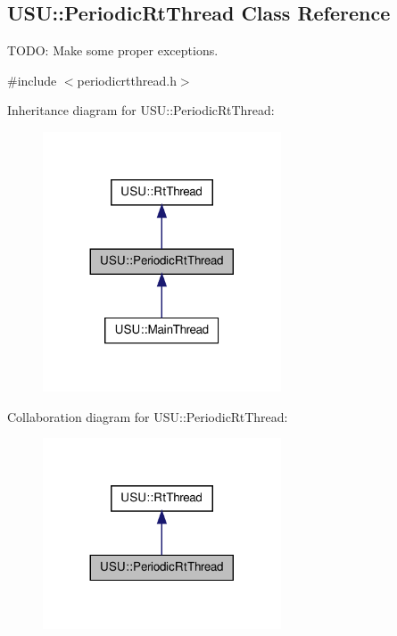 \hypertarget{class_u_s_u_1_1_periodic_rt_thread}{\subsection{\-U\-S\-U\-:\-:\-Periodic\-Rt\-Thread \-Class \-Reference}
\label{class_u_s_u_1_1_periodic_rt_thread}
}


\-T\-O\-D\-O\-: \-Make some proper exceptions.  




{\ttfamily \#include $<$periodicrtthread.\-h$>$}



\-Inheritance diagram for \-U\-S\-U\-:\-:\-Periodic\-Rt\-Thread\-:\nopagebreak
\begin{figure}[H]
\begin{center}
\leavevmode
\includegraphics[width=200pt]{class_u_s_u_1_1_periodic_rt_thread__inherit__graph}
\end{center}
\end{figure}


\-Collaboration diagram for \-U\-S\-U\-:\-:\-Periodic\-Rt\-Thread\-:\nopagebreak
\begin{figure}[H]
\begin{center}
\leavevmode
\includegraphics[width=200pt]{class_u_s_u_1_1_periodic_rt_thread__coll__graph}
\end{center}
\end{figure}
